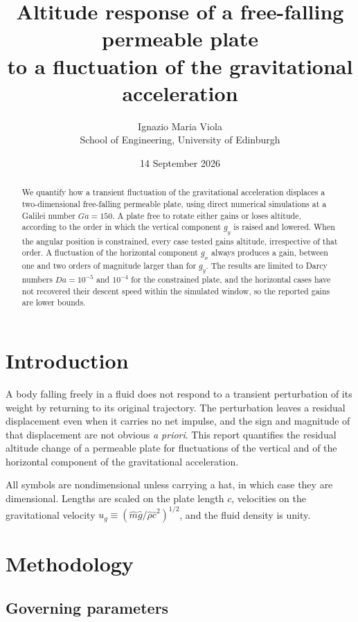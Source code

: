 \documentclass[11pt,a4paper]{article}
\title{Altitude response of a free-falling permeable plate\\to a fluctuation of the gravitational acceleration}
\author{Ignazio Maria Viola\\ School of Engineering, University of Edinburgh}
\date{14 September 2026}
\begin{document}
\maketitle

\begin{abstract}
\noindent We quantify how a transient fluctuation of the gravitational
acceleration displaces a two-dimensional free-falling permeable plate, using
direct numerical simulations at a Galilei number $Ga=150$. A plate free to
rotate either gains or loses altitude, according to the order in which the
vertical component $g_y$ is raised and lowered. When the angular position is
constrained, every case tested gains altitude, irrespective of that order. A
fluctuation of the horizontal component $g_x$ always produces a gain, between
one and two orders of magnitude larger than for $g_y$. The results are limited
to Darcy numbers $Da=10^{-5}$ and $10^{-4}$ for the constrained plate, and the
horizontal cases have not recovered their descent speed within the simulated
window, so the reported gains are lower bounds.
\end{abstract}

\section{Introduction}

A body falling freely in a fluid does not respond to a transient perturbation
of its weight by returning to its original trajectory. The perturbation leaves
a residual displacement even when it carries no net impulse, and the sign and
magnitude of that displacement are not obvious \emph{a priori}. This report
quantifies the residual altitude change of a permeable plate for fluctuations
of the vertical and of the horizontal component of the gravitational
acceleration.

All symbols are nondimensional unless carrying a hat, in which case they are
dimensional. Lengths are scaled on the plate length $c$, velocities on the
gravitational velocity $u_g \equiv (\hat m \hat g/\hat\rho \hat c^2)^{1/2}$,
and the fluid density is unity.

\section{Methodology}

\subsection{Governing parameters}
\end{document}
